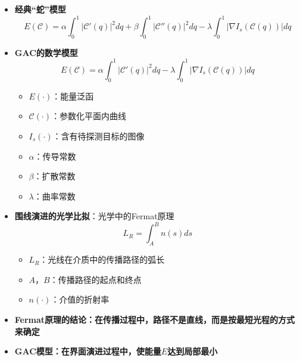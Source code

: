\begin{frame}
\begin{itemize}
 \item \textbf{经典“蛇”模型}
\begin{equation*}
E(\mathcal{C}) = \alpha \int_0^1 | \mathcal{C}'(q) |^2 dq + \beta \int_0^1 | \mathcal{C}''(q) |^2 dq - \lambda \int_0^1 | \nabla I_{s} ( \mathcal{C}(q) ) |dq
\end{equation*}
  \item \textbf{GAC的数学模型}
\begin{equation*}
E(\mathcal{C}) = \alpha \int_0^1 | \mathcal{C}'(q) |^2 dq - \lambda \int_0^1 | \nabla I_{s} ( \mathcal{C}(q) ) |dq
\end{equation*}
 \begin{itemize}
\item $E(\cdot)$：能量泛函
\item $\mathcal{C}(\cdot)$：参数化平面内曲线
\item $I_{s}(\cdot)$：含有待探测目标的图像
\item $\alpha$：传导常数
\item $\beta$：扩散常数
\item $\lambda$：曲率常数
\end{itemize}
\end{itemize}
\end{frame}

\begin{frame}
\begin{itemize}
 \item \textbf{围线演进的光学比拟}：光学中的Fermat原理
\begin{equation*}
L_{R} = \int_{A}^{B} n(s) ds
\end{equation*}
\begin{itemize}
\item $L_{R}$：光线在介质中的传播路径的弧长
\item $A$，$B$：传播路径的起点和终点
\item $n(\cdot)$：介值的折射率
\end{itemize}
 \item \textbf{Fermat原理的结论：在传播过程中，路径不是直线，而是按最短光程的方式来确定}
 \item \textbf{GAC模型：在界面演进过程中，使能量$E$达到局部最小}
\end{itemize}
\end{frame}

